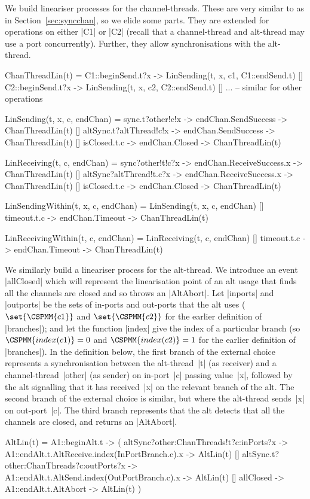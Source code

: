 We build lineariser processes for the channel-threads.  These are very similar
to as in Section~\ref{sec:syncchan}, so we elide some parts.  They are
extended for operations on either |C1| or |C2| (recall that a channel-thread
and alt-thread may use a port concurrently).  Further, they allow
synchronisations with the alt-thread.
\begin{cspm}
ChanThreadLin(t) = 
  C1::beginSend.t?x -> LinSending(t, x, c1, C1::endSend.t)
  [] C2::beginSend.t?x -> LinSending(t, x, c2, C2::endSend.t)
  [] ... -- similar for other operations 

LinSending(t, x, c, endChan) = 
  sync.t?other!c!x -> endChan.SendSuccess -> ChanThreadLin(t)
  [] altSync.t?altThread!c!x -> endChan.SendSuccess -> ChanThreadLin(t)
  [] isClosed.t.c -> endChan.Closed -> ChanThreadLin(t)

LinReceiving(t, c, endChan) = 
  sync?other!t!c?x -> endChan.ReceiveSuccess.x -> ChanThreadLin(t)
  [] altSync?altThread!t.c?x -> endChan.ReceiveSuccess.x -> ChanThreadLin(t)
  [] isClosed.t.c -> endChan.Closed -> ChanThreadLin(t)

LinSendingWithin(t, x, c, endChan) = 
  LinSending(t, x, c, endChan)
  [] timeout.t.c -> endChan.Timeout -> ChanThreadLin(t)

LinReceivingWithin(t, c, endChan) = 
  LinReceiving(t, c, endChan)
  [] timeout.t.c -> endChan.Timeout -> ChanThreadLin(t) 
\end{cspm}

We similarly build a lineariser process for the alt-thread.  We introduce an
event |allClosed| which will represent the linearisation point of an alt usage
that finds all the channels are closed and so throws an |AltAbort|.  
%
Let |inports| and |outports| be the sets of in-ports and out-ports that the
alt uses ($\set{\CSPMM{c1}}$ and $\set{\CSPMM{c2}}$ for the earlier definition
of |branches|); and let the function |index| give the index of a particular
branch (so $\CSPMM{index(c1)} = 0$ and $\CSPMM{index(c2)} = 1$ for the earlier
definition of |branches|).  In the definition below, the first branch of the
external choice represents a synchronisation between the alt-thread~|t| (as
receiver) and a channel-thread~|other| (as sender) on in-port~|c| passing
value~|x|, followed by the alt signalling that it has received~|x| on the
relevant branch of the alt.  The second branch of the external choice is
similar, but where the alt-thread sends~|x| on out-port~|c|.  The third branch
represents that the alt detects that all the channels are closed, and returns
an |AltAbort|.  
%
\begin{cspm}
AltLin(t) = 
  A1::beginAlt.t -> (
    altSync?other:ChanThreads!t?c:inPorts?x -> 
       A1::endAlt.t.AltReceive.index(InPortBranch.c).x -> AltLin(t)
    [] altSync.t?other:ChanThreads?c:outPorts?x -> 
          A1::endAlt.t.AltSend.index(OutPortBranch.c).x -> AltLin(t)
    [] allClosed -> A1::endAlt.t.AltAbort -> AltLin(t)
  )
\end{cspm}

